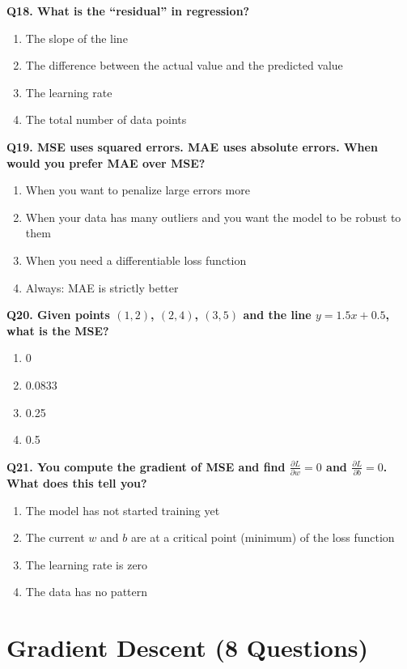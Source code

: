 \documentclass[12pt, a4paper]{article}
\newcommand{\question}[1]{\vspace{0.6em}\noindent\textbf{#1}}
\begin{document}
\question{Q18. What is the ``residual'' in regression?}
\begin{enumerate}[label=\alph*)]
    \item The slope of the line
    \item The difference between the actual value and the predicted value
    \item The learning rate
    \item The total number of data points
\end{enumerate}

\question{Q19. MSE uses squared errors. MAE uses absolute errors. When would you prefer MAE over MSE?}
\begin{enumerate}[label=\alph*)]
    \item When you want to penalize large errors more
    \item When your data has many outliers and you want the model to be robust to them
    \item When you need a differentiable loss function
    \item Always: MAE is strictly better
\end{enumerate}

\question{Q20. Given points $(1,2)$, $(2,4)$, $(3,5)$ and the line $y = 1.5x + 0.5$, what is the MSE?}
\begin{enumerate}[label=\alph*)]
    \item 0
    \item 0.0833
    \item 0.25
    \item 0.5
\end{enumerate}

\question{Q21. You compute the gradient of MSE and find $\frac{\partial L}{\partial w} = 0$ and $\frac{\partial L}{\partial b} = 0$. What does this tell you?}
\begin{enumerate}[label=\alph*)]
    \item The model has not started training yet
    \item The current $w$ and $b$ are at a critical point (minimum) of the loss function
    \item The learning rate is zero
    \item The data has no pattern
\end{enumerate}

\section{Gradient Descent (8 Questions)}
\end{document}
